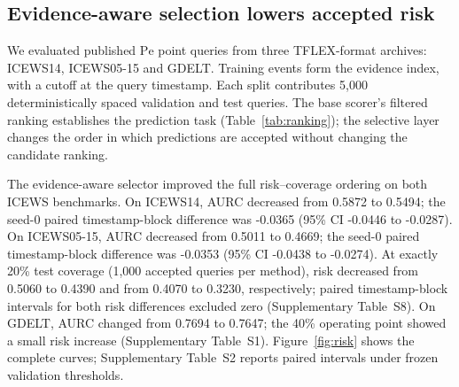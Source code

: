 \documentclass[preprint,12pt]{elsarticle}
\begin{document}
\subsection{Evidence-aware selection lowers accepted risk}
We evaluated published $\mathrm{Pe}$ point queries from three TFLEX-format archives: ICEWS14, ICEWS05-15 and GDELT. Training events form the evidence index, with a cutoff at the query timestamp. Each split contributes 5,000 deterministically spaced validation and test queries. The base scorer's filtered ranking establishes the prediction task (Table~\ref{tab:ranking}); the selective layer changes the order in which predictions are accepted without changing the candidate ranking.

\begin{table}[!htbp]
\centering
\caption{Causal filtered ranking on the public test queries. Ranking is deterministic once the evidence index is fixed.}
\label{tab:ranking}
\small
{}
\end{table}

The evidence-aware selector improved the full risk--coverage ordering on both ICEWS benchmarks. On ICEWS14, AURC decreased from 0.5872 to 0.5494; the seed-0 paired timestamp-block difference was -0.0365 (95\% CI -0.0446 to -0.0287). On ICEWS05-15, AURC decreased from 0.5011 to 0.4669; the seed-0 paired timestamp-block difference was -0.0353 (95\% CI -0.0438 to -0.0274). At exactly 20\% test coverage (1,000 accepted queries per method), risk decreased from 0.5060 to 0.4390 and from 0.4070 to 0.3230, respectively; paired timestamp-block intervals for both risk differences excluded zero (Supplementary Table~S8). On GDELT, AURC changed from 0.7694 to 0.7647; the 40\% operating point showed a small risk increase (Supplementary Table~S1). Figure~\ref{fig:risk} shows the complete curves; Supplementary Table~S2 reports paired intervals under frozen validation thresholds.
\end{document}
